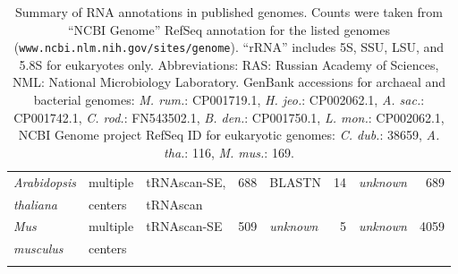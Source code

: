 \begin{footnotesize}
\begin{table}
\begin{center}
\begin{tabular}{|ll|lr|lr|lr|}
\emph{Arabidopsis}                       & multiple          & tRNAscan-SE,  & 688      & BLASTN         & 14 & \emph{unknown} & 689      \\
\emph{thaliana}                          & centers           & tRNAscan      &          &                &    &                &          \\ \hline
\emph{Mus}                               & multiple          & tRNAscan-SE   & 509  & \emph{unknown} & 5  & \emph{unknown} & 4059 \\
\emph{musculus}                          & centers           &               &          &                &    &                &          \\ %
\hline
\multicolumn{8}{l}{} \\
\end{tabular}

\caption{Summary of RNA annotations in published genomes.  Counts were
  taken from ``NCBI Genome'' RefSeq annotation for the listed genomes
  (\texttt{www.ncbi.nlm.nih.gov/sites/genome}). 
  ``rRNA'' includes 5S, SSU, LSU, and 5.8S for
  eukaryotes only. Abbreviations: RAS: Russian Academy of Sciences, NML: National Microbiology Laboratory.
  GenBank accessions for archaeal and bacterial genomes:
  \emph{M. rum.}: CP001719.1,
  \emph{H. jeo.}: CP002062.1,
  \emph{A. sac.}: CP001742.1,
  \emph{C. rod.}: FN543502.1,
  \emph{B. den.}: CP001750.1,
  \emph{L. mon.}: CP002062.1,
  NCBI Genome project RefSeq ID for eukaryotic genomes:
  \emph{C. dub.}: 38659,
  \emph{A. tha.}:   116,
  \emph{M. mus.}:   169.}
\end{center}
\end{table}
\end{footnotesize}



